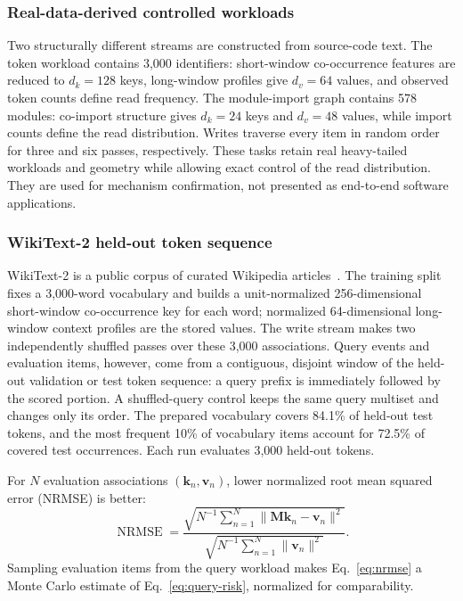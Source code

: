\documentclass[pdflatex,sn-mathphys-num]{sn-jnl}
\theoremstyle{thmstyleone}
\newcommand{\M}{\bm{M}}
\newcommand{\kvec}{\bm{k}}
\newcommand{\vvec}{\bm{v}}
\newcommand{\norm}[1]{\lVert#1\rVert}
\begin{document}
\subsubsection{Real-data-derived controlled workloads}
Two structurally different streams are constructed from source-code text. The token workload contains 3,000 identifiers: short-window co-occurrence features are reduced to $d_k=128$ keys, long-window profiles give $d_v=64$ values, and observed token counts define read frequency. The module-import graph contains 578 modules: co-import structure gives $d_k=24$ keys and $d_v=48$ values, while import counts define the read distribution. Writes traverse every item in random order for three and six passes, respectively. These tasks retain real heavy-tailed workloads and geometry while allowing exact control of the read distribution. They are used for mechanism confirmation, not presented as end-to-end software applications.

\subsubsection{WikiText-2 held-out token sequence}
WikiText-2 is a public corpus of curated Wikipedia articles~\cite{merity2016wikitext}. The training split fixes a 3,000-word vocabulary and builds a unit-normalized 256-dimensional short-window co-occurrence key for each word; normalized 64-dimensional long-window context profiles are the stored values. The write stream makes two independently shuffled passes over these 3,000 associations. Query events and evaluation items, however, come from a contiguous, disjoint window of the held-out validation or test token sequence: a query prefix is immediately followed by the scored portion. A shuffled-query control keeps the same query multiset and changes only its order. The prepared vocabulary covers 84.1\% of held-out test tokens, and the most frequent 10\% of vocabulary items account for 72.5\% of covered test occurrences. Each run evaluates 3,000 held-out tokens.

For $N$ evaluation associations $(\kvec_n,\vvec_n)$, lower normalized root mean squared error (NRMSE) is better:
\begin{equation}
 \operatorname{NRMSE}=
 \frac{\sqrt{N^{-1}\sum_{n=1}^{N}\norm{\M\kvec_n-\vvec_n}^{2}}}
 {\sqrt{N^{-1}\sum_{n=1}^{N}\norm{\vvec_n}^{2}}}.
 \label{eq:nrmse}
\end{equation}
Sampling evaluation items from the query workload makes Eq.~\eqref{eq:nrmse} a Monte Carlo estimate of Eq.~\eqref{eq:query-risk}, normalized for comparability.
\end{document}

